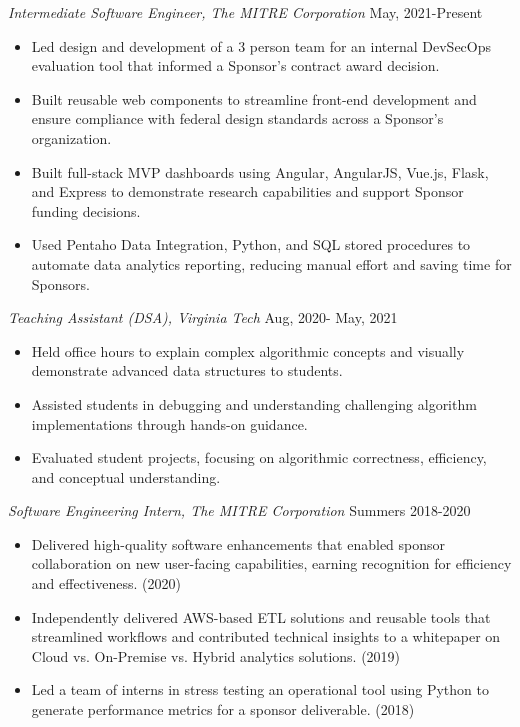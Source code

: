 \documentclass[margin, 10pt]{res} %
\begin{document}
\begin{resume}
{\sl Intermediate Software Engineer, The MITRE Corporation} \hfill May, 2021-Present\\

\begin{itemize} 
\item Led design and development of a 3 person team for an internal DevSecOps evaluation tool that informed a Sponsor’s contract award decision.
\item Built reusable web components to streamline front-end development and ensure compliance with federal design standards across a Sponsor’s organization.
\item Built full-stack MVP dashboards using Angular, AngularJS, Vue.js, Flask, and Express to demonstrate research capabilities and support Sponsor funding decisions.
\item Used Pentaho Data Integration, Python, and SQL stored procedures to automate data analytics reporting, reducing manual effort and saving time for Sponsors.

\end{itemize}
 
{\sl Teaching Assistant (DSA), Virginia Tech} \hfill Aug, 2020- May, 2021  \\

\begin{itemize} 
\item Held office hours to explain complex algorithmic concepts and visually demonstrate advanced data structures to students. 
\item Assisted students in debugging and understanding challenging algorithm implementations through hands-on guidance.
\item Evaluated student projects, focusing on algorithmic correctness, efficiency, and conceptual understanding.
\end{itemize} 

{\sl Software Engineering Intern, The MITRE Corporation} \hfill Summers 2018-2020  \\

\begin{itemize}
\item Delivered high-quality software enhancements that enabled sponsor collaboration on new user-facing capabilities, earning recognition for efficiency and effectiveness. (2020)
\item Independently delivered AWS-based ETL solutions and reusable tools that streamlined workflows and contributed technical insights to a whitepaper on Cloud vs. On-Premise vs. Hybrid analytics solutions. (2019)
\item Led a team of interns in stress testing an operational tool using Python to generate performance metrics for a sponsor deliverable. (2018)
\end{itemize} 


\end{resume}
\end{document}
